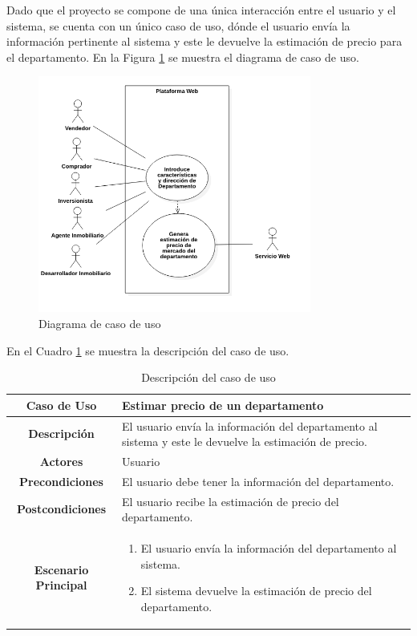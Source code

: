 Dado que el proyecto se compone de una única interacción entre el usuario y
el sistema, se cuenta con un único caso de uso, dónde el usuario envía la
información pertinente al sistema y este le devuelve la estimación de precio
para el departamento. En la Figura \ref{fig:caso_de_uso} se muestra el diagrama
de caso de uso.

\begin{figure}[H]
    \centering
    \includegraphics[width=0.8\textwidth]{imagenes/04-diseno/caso-de-uso.png}
    \caption{Diagrama de caso de uso}
    \label{fig:caso_de_uso}
\end{figure}

En el Cuadro \ref{tab:caso_de_uso} se muestra la descripción del caso de uso.

\begin{table}[H]
    \centering
    \begin{tabular}{|c|p{}|}
        \hline
        \textbf{Caso de Uso} & Estimar precio de un departamento \\
        \hline
        \textbf{Descripción} & El usuario envía la información del
        departamento al sistema y este le devuelve la estimación de precio. \\
        \hline
        \textbf{Actores} & Usuario \\
        \hline
        \textbf{Precondiciones} & El usuario debe tener la información del
        departamento. \\
        \hline
        \textbf{Postcondiciones} & El usuario recibe la estimación de precio
        del departamento. \\
        \hline
        \textbf{Escenario Principal} & \begin{enumerate}
            \item El usuario envía la información del departamento al sistema.
            \item El sistema devuelve la estimación de precio del departamento.
        \end{enumerate} \\
        \hline
    \end{tabular}
    \caption{Descripción del caso de uso}
    \label{tab:caso_de_uso}
\end{table}

